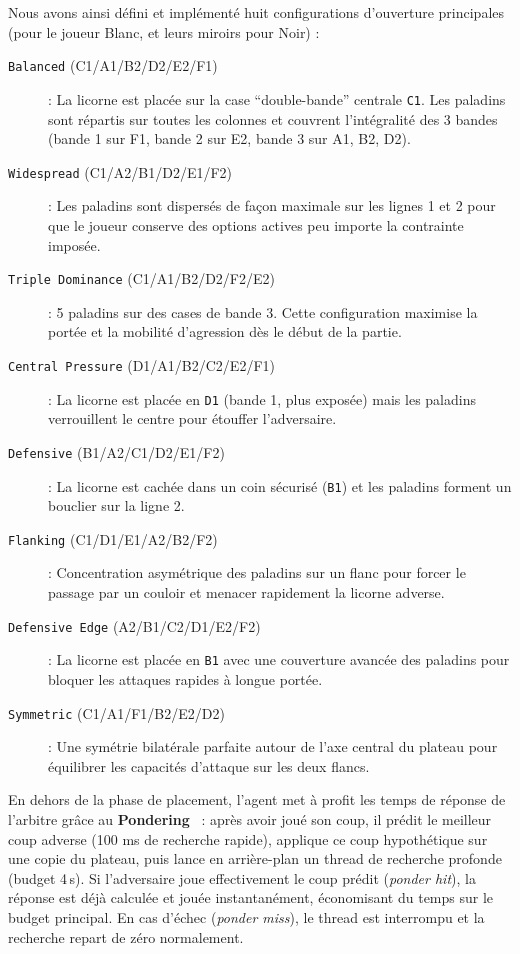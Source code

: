 \documentclass[12pt,a4paper]{article}
\begin{document}
Nous avons ainsi défini et implémenté huit configurations d'ouverture principales (pour le joueur Blanc, et leurs miroirs pour Noir) :
\begin{description}
    \item[\texttt{Balanced} (C1/A1/B2/D2/E2/F1)] : La licorne est placée sur la case ``double-bande'' centrale \texttt{C1}. Les paladins sont répartis sur toutes les colonnes et couvrent l'intégralité des 3 bandes (bande 1 sur F1, bande 2 sur E2, bande 3 sur A1, B2, D2).
    \item[\texttt{Widespread} (C1/A2/B1/D2/E1/F2)] : Les paladins sont dispersés de façon maximale sur les lignes 1 et 2 pour que le joueur conserve des options actives peu importe la contrainte imposée.
    \item[\texttt{Triple Dominance} (C1/A1/B2/D2/F2/E2)] : 5 paladins sur des cases de bande 3. Cette configuration maximise la portée et la mobilité d'agression dès le début de la partie.
    \item[\texttt{Central Pressure} (D1/A1/B2/C2/E2/F1)] : La licorne est placée en \texttt{D1} (bande 1, plus exposée) mais les paladins verrouillent le centre pour étouffer l'adversaire.
    \item[\texttt{Defensive} (B1/A2/C1/D2/E1/F2)] : La licorne est cachée dans un coin sécurisé (\texttt{B1}) et les paladins forment un bouclier sur la ligne 2.
    \item[\texttt{Flanking} (C1/D1/E1/A2/B2/F2)] : Concentration asymétrique des paladins sur un flanc pour forcer le passage par un couloir et menacer rapidement la licorne adverse.
    \item[\texttt{Defensive Edge} (A2/B1/C2/D1/E2/F2)] : La licorne est placée en \texttt{B1} avec une couverture avancée des paladins pour bloquer les attaques rapides à longue portée.
    \item[\texttt{Symmetric} (C1/A1/F1/B2/E2/D2)] : Une symétrie bilatérale parfaite autour de l'axe central du plateau pour équilibrer les capacités d'attaque sur les deux flancs.
\end{description}

En dehors de la phase de placement, l'agent met à profit les temps de réponse de l'arbitre grâce au \textbf{Pondering}~\cite{cp_pondering} : après avoir joué son coup, il prédit le meilleur coup adverse (100 ms de recherche rapide), applique ce coup hypothétique sur une copie du plateau, puis lance en arrière-plan un thread de recherche profonde (budget 4\,s). Si l'adversaire joue effectivement le coup prédit (\textit{ponder hit}), la réponse est déjà calculée et jouée instantanément, économisant du temps sur le budget principal. En cas d'échec (\textit{ponder miss}), le thread est interrompu et la recherche repart de zéro normalement.
\end{document}
